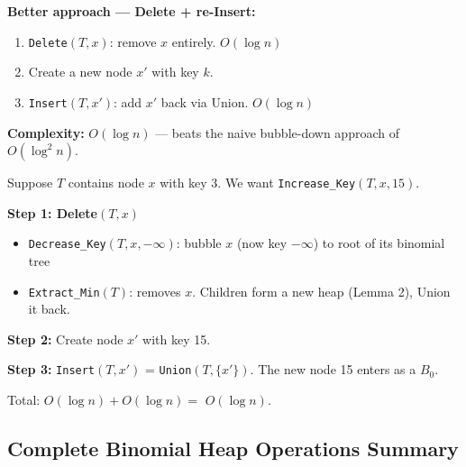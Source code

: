 \documentclass[11pt]{article}
\begin{document}
\textbf{Better approach — Delete + re-Insert:}

\begin{defbox}
\begin{enumerate}[leftmargin=1.4em,itemsep=2pt]
    \item \texttt{Delete$(T, x)$}: remove $x$ entirely. \hfill $O(\log n)$
    \item Create a new node $x'$ with key $k$.
    \item \texttt{Insert$(T, x')$}: add $x'$ back via Union. \hfill $O(\log n)$
\end{enumerate}
\end{defbox}

\textbf{Complexity:} \textcolor{greenO}{$O(\log n)$} — beats the naive bubble-down approach of $O(\log^2 n)$.

\begin{examplebox}
Suppose $T$ contains node $x$ with key 3. We want \texttt{Increase\_Key$(T, x, 15)$}.

\textbf{Step 1: Delete$(T, x)$}
\begin{itemize}[leftmargin=1.4em,itemsep=1pt]
    \item \texttt{Decrease\_Key$(T, x, -\infty)$}: bubble $x$ (now key $-\infty$) to root of its binomial tree
    \item \texttt{Extract\_Min$(T)$}: removes $x$. Children form a new heap (Lemma 2), Union it back.
\end{itemize}

\textbf{Step 2:} Create node $x'$ with key 15.

\textbf{Step 3:} \texttt{Insert$(T, x')$} = \texttt{Union$(T, \{x'\})$}. The new node 15 enters as a $B_0$.

Total: $O(\log n) + O(\log n) = $ \textcolor{greenO}{$O(\log n)$}.
\end{examplebox}

\subsection{Complete Binomial Heap Operations Summary}
\end{document}
